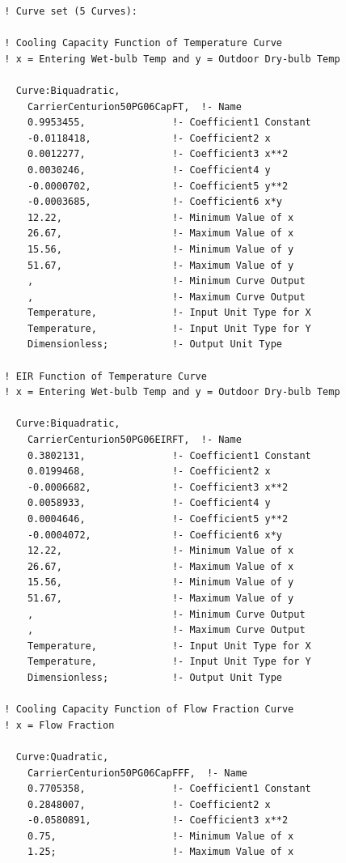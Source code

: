 \begin{lstlisting}
  ! Curve set (5 Curves):

  ! Cooling Capacity Function of Temperature Curve
  ! x = Entering Wet-bulb Temp and y = Outdoor Dry-bulb Temp

    Curve:Biquadratic,
      CarrierCenturion50PG06CapFT,  !- Name
      0.9953455,               !- Coefficient1 Constant
      -0.0118418,              !- Coefficient2 x
      0.0012277,               !- Coefficient3 x**2
      0.0030246,               !- Coefficient4 y
      -0.0000702,              !- Coefficient5 y**2
      -0.0003685,              !- Coefficient6 x*y
      12.22,                   !- Minimum Value of x
      26.67,                   !- Maximum Value of x
      15.56,                   !- Minimum Value of y
      51.67,                   !- Maximum Value of y
      ,                        !- Minimum Curve Output
      ,                        !- Maximum Curve Output
      Temperature,             !- Input Unit Type for X
      Temperature,             !- Input Unit Type for Y
      Dimensionless;           !- Output Unit Type

  ! EIR Function of Temperature Curve
  ! x = Entering Wet-bulb Temp and y = Outdoor Dry-bulb Temp

    Curve:Biquadratic,
      CarrierCenturion50PG06EIRFT,  !- Name
      0.3802131,               !- Coefficient1 Constant
      0.0199468,               !- Coefficient2 x
      -0.0006682,              !- Coefficient3 x**2
      0.0058933,               !- Coefficient4 y
      0.0004646,               !- Coefficient5 y**2
      -0.0004072,              !- Coefficient6 x*y
      12.22,                   !- Minimum Value of x
      26.67,                   !- Maximum Value of x
      15.56,                   !- Minimum Value of y
      51.67,                   !- Maximum Value of y
      ,                        !- Minimum Curve Output
      ,                        !- Maximum Curve Output
      Temperature,             !- Input Unit Type for X
      Temperature,             !- Input Unit Type for Y
      Dimensionless;           !- Output Unit Type

  ! Cooling Capacity Function of Flow Fraction Curve
  ! x = Flow Fraction

    Curve:Quadratic,
      CarrierCenturion50PG06CapFFF,  !- Name
      0.7705358,               !- Coefficient1 Constant
      0.2848007,               !- Coefficient2 x
      -0.0580891,              !- Coefficient3 x**2
      0.75,                    !- Minimum Value of x
      1.25;                    !- Maximum Value of x


\end{lstlisting}
